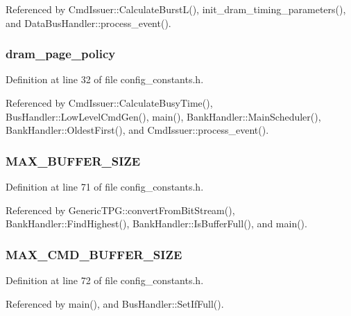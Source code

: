 Referenced by CmdIssuer::CalculateBurstL(), init\_\-dram\_\-timing\_\-parameters(), and DataBusHandler::process\_\-event().
\subsubsection[{dram\_\-page\_\-policy}]{ {\bf dram\_\-page\_\-policy}}\label{mc__constants_8h_9b7e9850a84a1625ba61689a4c8b7686}




Definition at line 32 of file config\_\-constants.h.

Referenced by CmdIssuer::CalculateBusyTime(), BusHandler::LowLevelCmdGen(), main(), BankHandler::MainScheduler(), BankHandler::OldestFirst(), and CmdIssuer::process\_\-event().
\subsubsection[{MAX\_\-BUFFER\_\-SIZE}]{ {\bf MAX\_\-BUFFER\_\-SIZE}}\label{mc__constants_8h_5834e03c9871421dab2ce0050888d6f9}




Definition at line 71 of file config\_\-constants.h.

Referenced by GenericTPG::convertFromBitStream(), BankHandler::FindHighest(), BankHandler::IsBufferFull(), and main().
\subsubsection[{MAX\_\-CMD\_\-BUFFER\_\-SIZE}]{ {\bf MAX\_\-CMD\_\-BUFFER\_\-SIZE}}\label{mc__constants_8h_7b3f5203e83ae79d6e9c365f6286dc97}




Definition at line 72 of file config\_\-constants.h.

Referenced by main(), and BusHandler::SetIfFull().
